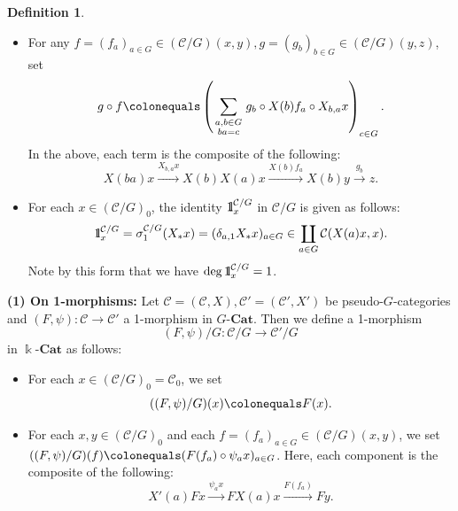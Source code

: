 \documentclass{surv-l}
\numberwithin{equation}{chapter}
\numberwithin{figure}{chapter}
\theoremstyle{plain}
\theoremstyle{definition}
\newtheorem{dfn}[thm]{Definition}
\theoremstyle{remark}
\newcommand{\id}{1\kern-.25em{\text{{\rm l}}}}
\newcommand{\kCat}{\Bbbk\text{-}\mathbf{Cat}}
\newcommand{\GCat}{G\text{-}\mathbf{Cat}}
\begin{document}
\begin{dfn}
\begin{itemize}
\item For any $f = (f_a)_{a \in G}\in ({\mathcal{C}}/G)(x,y), g = (g_b)_{b\in G} \in ({\mathcal{C}}/G)(y,z)$, set
\begin{equation}\label{eq:comp-orbitcat}
g \circ f\colonequals \left(\sum_{\begin{smallmatrix}a,b \in G\\ ba=c\end{smallmatrix}}
g_{b}\circ X(b)f_{a}\circ X_{b,a}x\right)_{c\in G}.
\end{equation}
In the above, each term is the composite of the following:
\begin{equation*}
X(ba)x \xrightarrow{X_{b,a}x} X(b)X(a)x \xrightarrow{X(b)f_a} X(b)y\xrightarrow{g_b} z.
\end{equation*}
\item
For each $x \in ({\mathcal{C}}/G)_0$, the identity $\id_x^{{\mathcal{C}}/G}$ in ${\mathcal{C}}/G$ is given as follows:
\begin{equation*}
\id_x^{{\mathcal{C}}/G} = \sigma^{{\mathcal{C}}/G}_1(X_*x) =(\delta_{a, 1}X_*x)_{a \in G} \in \coprod_{a\in G}{\mathcal{C}}(X(a)x, x).
\end{equation*}
Note by this form that we have $\deg \id_x^{{\mathcal{C}}/G} = 1$.
\end{itemize}

{\bf (1) On 1-morphisms:}
Let ${\mathcal{C}} =({\mathcal{C}}, X), {\mathcal{C}}'=({\mathcal{C}}', X')$ be pseudo-$G$-categories and
$(F, \psi)\colon {\mathcal{C}} \to {\mathcal{C}}'$ a 1-morphism in $\GCat$.
Then we define a 1-morphism
\begin{equation*}
(F, \psi)/G \colon {\mathcal{C}}/G \to {\mathcal{C}}'/G
\end{equation*}
in $\kCat$ as follows:
\begin{itemize}
\item For each $x \in ({\mathcal{C}}/G)_0 = {\mathcal{C}}_0$, we set
\begin{equation}\label{eq:1-mor-orbit}
((F, \psi)/G)(x)\colonequals F(x).
\end{equation}
\item For each $x, y \in ({\mathcal{C}}/G)_0$ and each
$f=(f_a)_{a\in G} \in ({\mathcal{C}}/G)(x, y)$, we set
$((F,\psi)/G)(f)\colonequals  (F(f_a)\circ \psi_ax)_{a\in G}$.
Here, each component is the composite of the following:
\begin{equation*}
X'(a)Fx \xrightarrow{\psi_ax} FX(a)x \xrightarrow{F(f_a)} Fy.
\end{equation*}
\end{itemize}


\end{dfn}
\end{document}
